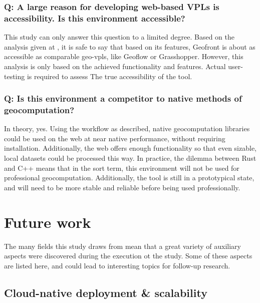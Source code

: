 
\subsubsection*{Q: A large reason for developing web-based VPLs is accessibility.  Is this environment accessible?}

This study can only answer this question to a limited degree. 
Based on the analysis given at , it is safe to say that based on its features, Geofront is about as accessible as comparable geo-vpls, like Geoflow or Grasshopper. 
However, this analysis is only based on the achieved functionality and features. 
Actual user-testing is required to assess The true accessibility of the tool.

\subsubsection*{Q: Is this environment a competitor to native methods of geocomputation?}

In theory, yes.
Using the workflow as described, native geocomputation libraries could be used on the web at near native performance, without requiring installation.
Additionally, the web offers enough functionality so that even sizable, local datasets could be processed this way.
In practice, the dilemma between Rust and C++ means that in the sort term, this environment will not be used for professional geocomputation.
Additionally, the tool is still in a prototypical state, and will need to be more stable and reliable before being used professionally. 


\section{Future work}
\label{sec:future-work}
The many fields this study draws from mean that a great variety of auxiliary aspects were discovered during the execution ot the study. 
Some of these aspects are listed here, and could lead to interesting topics for follow-up research. 

\subsection{Cloud-native deployment \& scalability}

